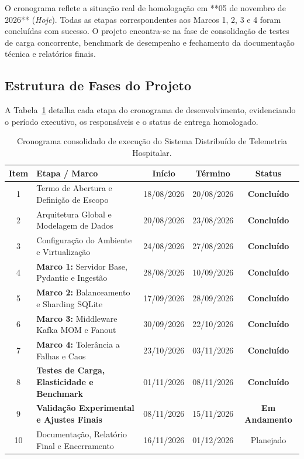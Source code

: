 \documentclass[12pt,a4paper]{article}
\begin{document}
O cronograma reflete a situação real de homologação em **05 de novembro de 2026** (\textit{Hoje}). Todas as etapas correspondentes aos Marcos 1, 2, 3 e 4 foram concluídas com sucesso. O projeto encontra-se na fase de consolidação de testes de carga concorrente, benchmark de desempenho e fechamento da documentação técnica e relatórios finais.

\subsection{Estrutura de Fases do Projeto}
A Tabela~\ref{tab:fases_gantt} detalha cada etapa do cronograma de desenvolvimento, evidenciando o período executivo, os responsáveis e o status de entrega homologado.

\begin{table}[H]
	\centering
	\small
	\begin{tabularx}{\textwidth}{c p{5.5cm} c c c}
		\toprule
		\textbf{Item} & \textbf{Etapa / Marco} & \textbf{Início} & \textbf{Término} & \textbf{Status} \\
		\midrule
		1 & Termo de Abertura e Definição de Escopo & 18/08/2026 & 20/08/2026 & \textbf{Concluído} \\
		2 & Arquitetura Global e Modelagem de Dados & 20/08/2026 & 23/08/2026 & \textbf{Concluído} \\
		3 & Configuração do Ambiente e Virtualização & 24/08/2026 & 27/08/2026 & \textbf{Concluído} \\
		4 & \textbf{Marco 1:} Servidor Base, Pydantic e Ingestão & 28/08/2026 & 10/09/2026 & \textbf{Concluído} \\
		5 & \textbf{Marco 2:} Balanceamento e Sharding SQLite & 17/09/2026 & 28/09/2026 & \textbf{Concluído} \\
		6 & \textbf{Marco 3:} Middleware Kafka MOM e Fanout & 30/09/2026 & 22/10/2026 & \textbf{Concluído} \\
		7 & \textbf{Marco 4:} Tolerância a Falhas e Caos & 23/10/2026 & 03/11/2026 & \textbf{Concluído} \\
		8 & \textbf{Testes de Carga, Elasticidade e Benchmark} & 01/11/2026 & 08/11/2026 & \textbf{Concluído} \\
		9 & \textbf{Validação Experimental e Ajustes Finais} & 08/11/2026 & 15/11/2026 & \textbf{Em Andamento} \\
		10 & Documentação, Relatório Final e Encerramento & 16/11/2026 & 01/12/2026 & Planejado \\
		\bottomrule
	\end{tabularx}
	\caption{Cronograma consolidado de execução do Sistema Distribuído de Telemetria Hospitalar.}
	\label{tab:fases_gantt}
\end{table}
\end{document}
